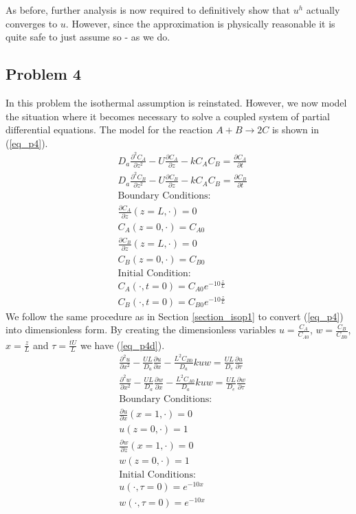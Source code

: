 \documentclass[11pt,fleqn]{article}
\theoremstyle{defstyle}
\begin{document}
As before, further analysis is now required to definitively show that $u^h$ actually converges to $u$. However, since the approximation is physically reasonable it is quite safe to just assume so - as we do.

\subsection{Problem 4}
In this problem the isothermal assumption is reinstated. However, we now model the situation where it becomes necessary to solve a coupled system of partial differential equations. The model for the reaction $A + B \rightarrow 2C$ is shown in (\ref{eq_p4}). 
\begin{equation}
\begin{aligned}
&D_a \frac{\partial^2 C_A}{\partial z^2} - U \frac{\partial C_A}{\partial z} - kC_AC_B 
= \frac{\partial C_A}{\partial t} \\
&D_a \frac{\partial^2 C_B}{\partial z^2} - U \frac{\partial C_B}{\partial z} - kC_AC_B 
= \frac{\partial C_B}{\partial t} \\
&\text{Boundary Conditions:} \\
&\frac{\partial C_A}{\partial z}(z=L, \cdot) = 0\\
&C_A(z=0, \cdot) = C_{A0} \\
&\frac{\partial C_B}{\partial z}(z=L, \cdot) = 0\\
&C_B(z=0, \cdot) = C_{B0} \\
&\text{Initial Condition:} \\
& C_A(\cdot, t= 0) = C_{A0}e^{-10\frac{z}{L}} \\
& C_B(\cdot, t= 0) = C_{B0}e^{-10\frac{z}{L}}
\end{aligned}
\label{eq_p4}
\end{equation}
We follow the same procedure as in Section \ref{section_isop1} to convert (\ref{eq_p4}) into dimensionless form. By creating the dimensionless variables $u=\frac{C_A}{C_{A0}}$, $w=\frac{C_B}{C_{B0}}$, $x = \frac{z}{L}$ and $\tau = \frac{tU}{L}$ we have (\ref{eq_p4d}).
\begin{equation}
\begin{aligned}
&\frac{\partial^2 u}{\partial x^2} - \frac{UL}{D_a} \frac{\partial u}{\partial x} - \frac{L^2C_{B0}}{D_a}kuw 
= \frac{UL}{D_e}\frac{\partial u}{\partial \tau} \\
&\frac{\partial^2 w}{\partial x^2} - \frac{UL}{D_a} \frac{\partial w}{\partial x} - \frac{L^2C_{A0}}{D_a}kuw 
= \frac{UL}{D_e}\frac{\partial w}{\partial \tau} \\
&\text{Boundary Conditions:} \\
&\frac{\partial u}{\partial x}(x=1, \cdot) = 0\\
&u(z=0, \cdot) = 1 \\
&\frac{\partial w}{\partial z}(x=1, \cdot) = 0\\
&w(z=0, \cdot) = 1 \\
&\text{Initial Conditions:} \\
& u(\cdot, \tau= 0) = e^{-10x} \\
& w(\cdot, \tau= 0) = e^{-10x}
\end{aligned}
\label{eq_p4d}
\end{equation}
\end{document}
